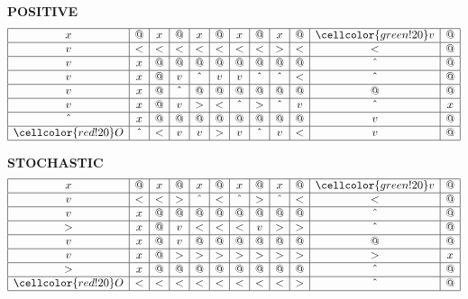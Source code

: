 \documentclass{article}
\begin{document}
\small \textbf{POSITIVE}
\[
	\begin{array}{|c|c|c|c|c|c|c|c|c|c|c|c|}
		\hline
		x                   & @      & x & @      & x      & @ & x      & @      & x      & @ & \cellcolor{green!20} v & @ \\ \hline
		v                   & <      & < & <      & <      & < & <      & <      & >      & < & <                      & @ \\ \hline
		v                   & x      & @ & @      & @      & @ & @      & @      & @      & @ & \hat{}                 & @ \\ \hline
		v                   & x      & @ & v      & \hat{} & v & v      & \hat{} & \hat{} & < & \hat{}                 & @ \\ \hline
		v                   & x      & @ & \hat{} & @      & @ & @      & @      & @      & @ & @                      & @ \\ \hline
		v                   & x      & @ & v      & >      & < & \hat{} & >      & \hat{} & v & \hat{}                 & x \\ \hline
		\hat{}              & x      & @ & @      & @      & @ & @      & @      & @      & @ & v                      & @ \\ \hline
		\cellcolor{red!20}O & \hat{} & < & v      & v      & > & v      & \hat{} & v      & < & v                      & @ \\ \hline
	\end{array}
\]

\small \textbf{STOCHASTIC}
\[
	\begin{array}{|c|c|c|c|c|c|c|c|c|c|c|c|}
		\hline
		x                   & @ & x & @ & x      & @ & x      & @ & x      & @ & \cellcolor{green!20}v & @ \\ \hline
		v                   & < & < & > & \hat{} & < & \hat{} & > & \hat{} & < & <                     & @ \\ \hline
		v                   & x & @ & @ & @      & @ & @      & @ & @      & @ & \hat{}                & @ \\ \hline
		>                   & x & @ & v & <      & < & <      & v & >      & > & \hat{}                & @ \\ \hline
		v                   & x & @ & v & @      & @ & @      & @ & @      & @ & @                     & @ \\ \hline
		v                   & x & @ & > & >      & > & >      & > & >      & > & >                     & x \\ \hline
		>                   & x & @ & @ & @      & @ & @      & @ & @      & @ & \hat{}                & @ \\ \hline
		\cellcolor{red!20}O & < & < & < & <      & < & <      & < & <      & > & \hat{}                & @ \\ \hline
	\end{array}
\]
\end{document}
